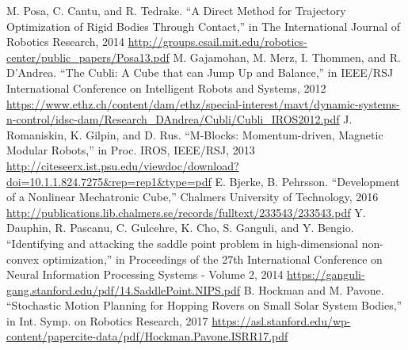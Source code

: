 \documentclass[conference]{IEEEtran}
\begin{document}
\begin{thebibliography}{00}
 M. Posa, C. Cantu, and R. Tedrake. ``A Direct Method for Trajectory Optimization of Rigid Bodies Through Contact,'' in The International Journal of Robotics Research, 2014 \url{http://groups.csail.mit.edu/robotics-center/public_papers/Posa13.pdf}
 M. Gajamohan, M. Merz, I. Thommen, and R. D'Andrea. ``The Cubli: A Cube that can Jump Up and Balance,'' in IEEE/RSJ International Conference on
Intelligent Robots and Systems, 2012 \url{https://www.ethz.ch/content/dam/ethz/special-interest/mavt/dynamic-systems-n-control/idsc-dam/Research_DAndrea/Cubli/Cubli_IROS2012.pdf}
 J. Romaniskin, K. Gilpin, and D. Rus. ``M-Blocks: Momentum-driven, Magnetic Modular Robots,'' in Proc. IROS, IEEE/RSJ, 2013
\url{http://citeseerx.ist.psu.edu/viewdoc/download?doi=10.1.1.824.7275&rep=rep1&type=pdf}
 E. Bjerke, B. Pehrsson. ``Development of a Nonlinear Mechatronic Cube,'' Chalmers University of Technology, 2016
\url{http://publications.lib.chalmers.se/records/fulltext/233543/233543.pdf}
 Y. Dauphin, R. Pascanu, C. Gulcehre, K. Cho, S. Ganguli, and Y. Bengio. ``Identifying and attacking the saddle point problem in high-dimensional non-convex optimization,'' in Proceedings of the 27th International Conference on Neural Information Processing Systems - Volume 2, 2014
\url{https://ganguli-gang.stanford.edu/pdf/14.SaddlePoint.NIPS.pdf}
 B. Hockman and M. Pavone. ``Stochastic Motion Planning for Hopping Rovers on Small Solar System Bodies,'' in Int. Symp. on Robotics Research, 2017
\url{https://asl.stanford.edu/wp-content/papercite-data/pdf/Hockman.Pavone.ISRR17.pdf}
\end{thebibliography}


\vspace{12pt}
\end{document}
